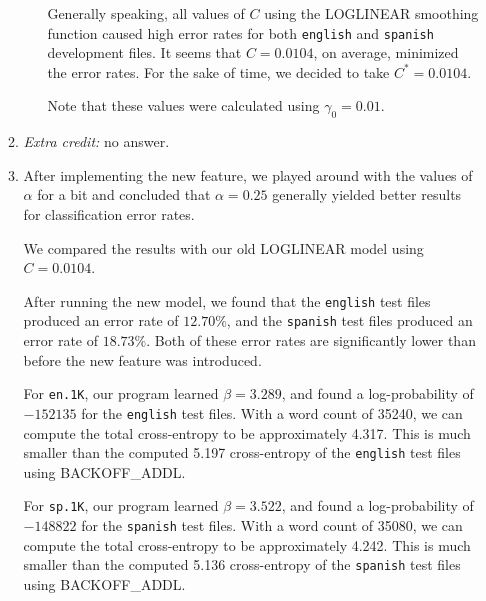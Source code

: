 \documentclass[11pt]{article}
\begin{document}
\begin{enumerate}
\begin{enumerate}[label=(\alph*)]
\begin{itemize}
			Generally speaking, all values of $C$ using the LOGLINEAR smoothing function caused high error rates for both \texttt{english} and \texttt{spanish} development files. It seems that $C = 0.0104$, on average, minimized the error rates. For the sake of time, we decided to take $C^* = 0.0104$.

			Note that these values were calculated using $\gamma_0 = 0.01$.

		\end{itemize} \vspace{8pt}


	\item %
		\textit{Extra credit:} no answer.
	\item %

		After implementing the new feature, we played around with the values of $\alpha$ for a bit and concluded that $\alpha=0.25$ generally yielded better results for classification error rates. 

		We compared the results with our old LOGLINEAR model using $C = 0.0104$.

		After running the new model, we found that the \texttt{english} test files produced an error rate of $12.70\%$, and the \texttt{spanish} test files produced an error rate of $18.73\%$. Both of these error rates are significantly lower than before the new feature was introduced.

		For \texttt{en.1K}, our program learned $\beta = 3.289$, and found a log-probability of $-152135$ for the \texttt{english} test files. With a word count of 35240, we can compute the total cross-entropy to be approximately 4.317. This is much smaller than the computed 5.197 cross-entropy of the \texttt{english} test files using BACKOFF\_ADDL.

		For \texttt{sp.1K}, our program learned $\beta = 3.522$, and found a log-probability of $-148822$ for the \texttt{spanish} test files. With a word count of 35080, we can compute the total cross-entropy to be approximately 4.242. This is much smaller than the computed 5.136 cross-entropy of the \texttt{spanish} test files using BACKOFF\_ADDL.


\end{enumerate}
\end{enumerate}
\end{document}
